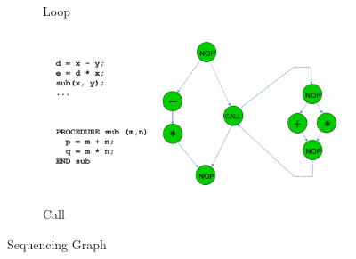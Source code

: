 \begin{figure}[h]
\begin{center}
\begin{subfigure}[b]{0.4\textwidth}
		\caption{Loop}
		\label{fig:SG_loop}
	\end{subfigure}
	\hfill
	\begin{subfigure}[b]{0.5\textwidth}
		\includegraphics[width=\textwidth]{images/SG_call.png}
		\caption{Call}
		\label{fig:SG_call}
	\end{subfigure}
	\caption{Sequencing Graph}
	\end{center}
\end{figure}




